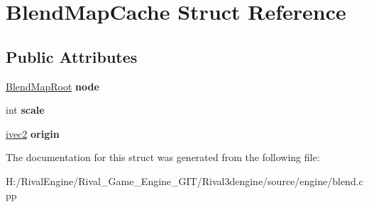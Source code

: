 \hypertarget{struct_blend_map_cache}{}\section{Blend\+Map\+Cache Struct Reference}
\label{struct_blend_map_cache}
\subsection*{Public Attributes}
\begin{DoxyCompactItemize}
\item 
\mbox{\label{struct_blend_map_cache_a9df8201d08307470db49b0ad1d038a4f}} 
\hyperlink{struct_blend_map_root}{Blend\+Map\+Root} {\bfseries node}
\item 
\mbox{\label{struct_blend_map_cache_a51c90afa2edd8ff7a4868aa525a8f236}} 
int {\bfseries scale}
\item 
\mbox{\label{struct_blend_map_cache_aa8145f41971c931cafd0df607cd273d2}} 
\hyperlink{structivec2}{ivec2} {\bfseries origin}
\end{DoxyCompactItemize}


The documentation for this struct was generated from the following file\+:\begin{DoxyCompactItemize}
\item 
H\+:/\+Rival\+Engine/\+Rival\+\_\+\+Game\+\_\+\+Engine\+\_\+\+G\+I\+T/\+Rival3dengine/source/engine/blend.\+cpp\end{DoxyCompactItemize}
